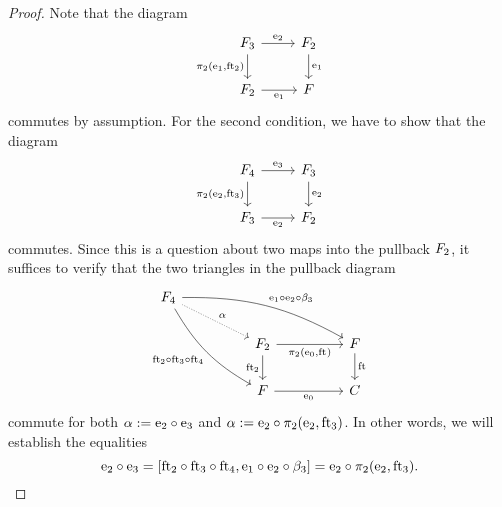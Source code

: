 \begin{proof}
Note that the diagram
\begin{equation*}
\begin{tikzcd}
\stesysf_3
  \ar{d}[swap]{\pullbackpr{2}{\efamext}{\eft[2]}}
  \ar{r}{\eext{2}}
  & 
\stesysf_2 
  \ar{d}{\efamext} 
  \\
\stesysf_2 
  \ar{r}[swap]{\efamext} 
  &
\stesysf
\end{tikzcd}
\end{equation*}
commutes by assumption. For the second condition, we have to show that the
diagram
\begin{equation*}
\begin{tikzcd}
\stesysf_4
  \ar{d}[swap]{\pullbackpr{2}{\eext{2}}{\eft[3]}}
  \ar{r}{\eext{3}}
  & 
\stesysf_3
  \ar{d}{\eext{2}} 
  \\
\stesysf_3
  \ar{r}[swap]{\eext{2}} 
  &
\stesysf_2
\end{tikzcd}
\end{equation*}
commutes. Since this is a question about two maps into the pullback
$\stesysf_2$, it suffices to verify that the two triangles in the pullback
diagram
\begin{equation*}
\begin{tikzcd}[column sep=huge]
\stesysf_4
  \arrow[drr,"\eext{1}\circ\eext{2}\circ\beta_3",bend left=15]
  \arrow[ddr,swap,"{\eft[2]\circ\eft[3]\circ\eft[4]}",bend right=15]
  \arrow[dr,"\alpha",densely dotted]
  \\
{}&
\stesysf_2
  \arrow[r,swap,"\pullbackpr{2}{\ectxext}{\eft}"]
  \arrow[d,swap,"{\eft[2]}"]
  &
\stesysf
  \arrow[d,"\eft"]
  \\
{}&
\stesysf
  \arrow[r,swap,"\ectxext"]
  &
\stesysc
\end{tikzcd}
\end{equation*}
commute for both $\alpha:=\eext{2}\circ\eext{3}$ and 
$\alpha:=\eext{2}\circ\pullbackpr{2}{\eext{2}}{\eft[3]}$. In other words, we
will establish the equalities
\begin{equation}
\eext{2}\circ\eext{3}
  =
[\eft[2]\circ\eft[3]\circ\eft[4],\eext{1}\circ\eext{2}\circ\beta_3]
  =
\eext{2}\circ\pullbackpr{2}{\eext{2}}{\eft[3]}.
\end{equation}
\begin{comment}
\begin{align*}
\pullbackpr{1}{\ectxext}{\eft}\circ\eext{2}\circ\eext{3}
  & =
\pullbackpr{1}{\ectxext}{\eft}\circ\eext{2}\circ\pullbackpr{2}{\eext{2}}{\eft[3]}
  \\
\pullbackpr{2}{\ectxext}{\eft}\circ\eext{2}\circ\eext{3}

\end{comment}
\end{proof}
